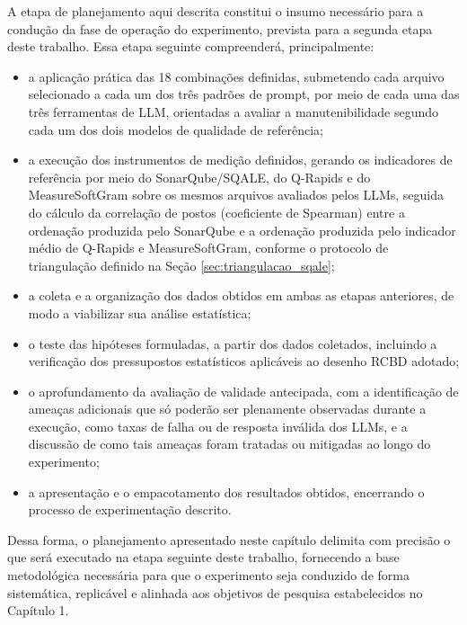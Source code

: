 A etapa de planejamento aqui descrita constitui o insumo necessário para a condução da fase de operação do experimento, prevista para a segunda etapa deste trabalho. Essa etapa seguinte compreenderá, principalmente:

\begin{itemize}
    \item a aplicação prática das 18 combinações definidas, submetendo cada arquivo selecionado a cada um dos três padrões de prompt, por meio de cada uma das três ferramentas de LLM, orientadas a avaliar a manutenibilidade segundo cada um dos dois modelos de qualidade de referência;

    \item a execução dos instrumentos de medição definidos, gerando os indicadores de referência por meio do SonarQube/SQALE, do Q-Rapids e do MeasureSoftGram sobre os mesmos arquivos avaliados pelos LLMs, seguida do cálculo da correlação de postos (coeficiente de Spearman) entre a ordenação produzida pelo SonarQube e a ordenação produzida pelo indicador médio de Q-Rapids e MeasureSoftGram, conforme o protocolo de triangulação definido na Seção \ref{sec:triangulacao_sqale};

    \item a coleta e a organização dos dados obtidos em ambas as etapas anteriores, de modo a viabilizar sua análise estatística;

    \item o teste das hipóteses formuladas, a partir dos dados coletados, incluindo a verificação dos pressupostos estatísticos aplicáveis ao desenho RCBD adotado;

    \item o aprofundamento da avaliação de validade antecipada, com a identificação de ameaças adicionais que só poderão ser plenamente observadas durante a execução, como taxas de falha ou de resposta inválida dos LLMs, e a discussão de como tais ameaças foram tratadas ou mitigadas ao longo do experimento;

    \item a apresentação e o empacotamento dos resultados obtidos, encerrando o processo de experimentação descrito.
\end{itemize}

Dessa forma, o planejamento apresentado neste capítulo delimita com precisão o que será executado na etapa seguinte deste trabalho, fornecendo a base metodológica necessária para que o experimento seja conduzido de forma sistemática, replicável e alinhada aos objetivos de pesquisa estabelecidos no Capítulo 1.

